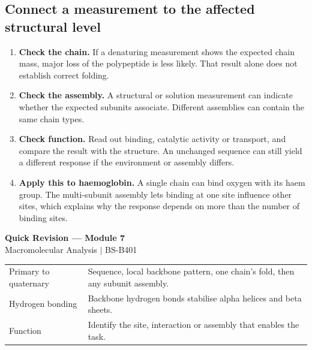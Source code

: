 \documentclass[12pt,a4paper]{article}
\renewcommand{\arraystretch}{1.45}
\begin{document}
\subsection{Connect a measurement to the affected structural level}
\begin{enumerate}[leftmargin=*, itemsep=2pt]
  \item \textbf{Check the chain.} If a denaturing measurement shows the expected chain mass, major loss of the polypeptide is less likely. That result alone does not establish correct folding.
  \item \textbf{Check the assembly.} A structural or solution measurement can indicate whether the expected subunits associate. Different assemblies can contain the same chain types.
  \item \textbf{Check function.} Read out binding, catalytic activity or transport, and compare the result with the structure. An unchanged sequence can still yield a different response if the environment or assembly differs.
  \item \textbf{Apply this to haemoglobin.} A single chain can bind oxygen with its haem group. The multi-subunit assembly lets binding at one site influence other sites, which explains why the response depends on more than the number of binding sites.
\end{enumerate}

\newpage
\begin{center}
  {\large\bfseries\color{myred} Quick Revision --- Module 7}\\[3pt]
  {\small\color{mydark} Macromolecular Analysis $|$ BS-B401}
\end{center}
\noindent{\color{myred}\rule{\linewidth}{1.2pt}}\par\vspace{4pt}

\begin{tcolorbox}[formulabox, title={Key Concepts at a Glance}]
\renewcommand{\arraystretch}{1.35}
\noindent\begin{tabularx}{\linewidth}{B{4.5cm}Y}
Primary to quaternary & Sequence, local backbone pattern, one chain's fold, then any subunit assembly. \\[3pt]
Hydrogen bonding & Backbone hydrogen bonds stabilise alpha helices and beta sheets. \\[3pt]
Function & Identify the site, interaction or assembly that enables the task. \\[3pt]
\end{tabularx}\par
\end{tcolorbox}
\end{document}

